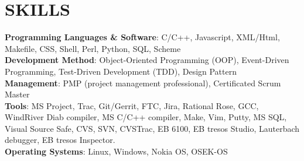 
\section{SKILLS} \textbf{Programming Languages \& Software}:
C/C++, Javascript, XML/Html, Makefile, CSS, Shell, Perl, Python, SQL, Scheme\\
                \textbf{Development Method}:
                Object-Oriented Programming (OOP),
                Event-Driven Programming,
                Test-Driven Development (TDD),
                Design Pattern\\
                \textbf{Management}: PMP (project management professional), Certificated Scrum Master\\
                \textbf{Tools}:
                MS Project, Trac, Git/Gerrit, FTC, Jira, Rational Rose,
                GCC, WindRiver Diab compiler, MS C/C++ compiler, Make,
                Vim, Putty, MS SQL, Visual Source Safe, CVS, SVN, CVSTrac,
                EB 6100, EB tresos Studio, Lauterbach debugger, EB tresos Inspector. \\
                \textbf{Operating Systems}: Linux, Windows, Nokia OS, OSEK-OS

